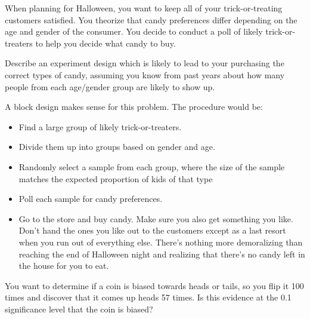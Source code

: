 \documentclass[landscape]{exam}
\begin{document}
\begin{questions}
    \ifprintanswers{}
    \else
      \newpage
    \fi

    \question[5]
      When planning for Halloween, you want to keep all of your
      trick-or-treating customers satisfied. You theorize that candy preferences
      differ depending on the age and gender of the consumer.  You decide to
      conduct a poll of likely trick-or-treaters to help you decide what candy
      to buy. 
      
      Describe an experiment design which is likely to lead to your purchasing
      the correct types of candy, assuming you know from past years about how
      many people from each age/gender group are likely to show up. 

      \begin{solution}
        A block design makes sense for this problem. The procedure would be:

        \begin{itemize}
          \item Find a large group of likely trick-or-treaters.

          \item Divide them up into groups based on gender and age.

          \item Randomly select a sample from each group, where the size of the
            sample matches the expected proportion of kids of that type

          \item Poll each sample for candy preferences.

          \item Go to the store and buy candy.  Make sure you also get something
            you like. Don't hand the ones you like out to the customers except
            as a last resort when you run out of everything else. There's
            nothing more demoralizing than reaching the end of Halloween night
            and realizing that there's no candy left in the house for you to
            eat.

        \end{itemize}

      \end{solution}

    \question[12]
      You want to determine if a coin is biased towards heads or tails, so you
      flip it 100 times and discover that it comes up heads 57 times. Is this
      evidence at the 0.1 significance level that the coin is biased?


\end{questions}
\end{document}
